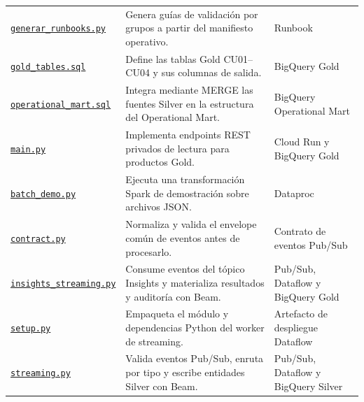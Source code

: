 \documentclass[11pt]{article}
\begin{document}
\begin{longtable}{@{}>{\raggedright\arraybackslash}p{}>{\raggedright\arraybackslash}p{}>{\raggedright\arraybackslash}p{}@{}}
\href{https://github.com/Codenid/lumina-retail-data-platform/blob/main/implementation/docs/operacion/runbooks/generar_runbooks.py}{\texttt{generar\_\allowbreak{}runbooks.py}} & Genera guías de validación por grupos a partir del manifiesto operativo. & Runbook \\
\href{https://github.com/Codenid/lumina-retail-data-platform/blob/main/implementation/automatizacion/configuracion/contratos/gold_tables.sql}{\texttt{gold\_\allowbreak{}tables.sql}} & Define las tablas Gold CU01–CU04 y sus columnas de salida. & BigQuery Gold \\
\href{https://github.com/Codenid/lumina-retail-data-platform/blob/main/implementation/automatizacion/configuracion/contratos/operational_mart.sql}{\texttt{operational\_\allowbreak{}mart.sql}} & Integra mediante MERGE las fuentes Silver en la estructura del Operational Mart. & BigQuery Operational Mart \\
\href{https://github.com/Codenid/lumina-retail-data-platform/blob/main/implementation/soluciones/api-insights/main.py}{\texttt{main.py}} & Implementa endpoints REST privados de lectura para productos Gold. & Cloud Run y BigQuery Gold \\
\href{https://github.com/Codenid/lumina-retail-data-platform/blob/main/implementation/soluciones/procesamiento-batch/batch_demo.py}{\texttt{batch\_\allowbreak{}demo.py}} & Ejecuta una transformación Spark de demostración sobre archivos JSON. & Dataproc \\
\href{https://github.com/Codenid/lumina-retail-data-platform/blob/main/implementation/soluciones/procesamiento-streaming/contract.py}{\texttt{contract.py}} & Normaliza y valida el envelope común de eventos antes de procesarlo. & Contrato de eventos Pub/Sub \\
\href{https://github.com/Codenid/lumina-retail-data-platform/blob/main/implementation/soluciones/procesamiento-streaming/insights_streaming.py}{\texttt{insights\_\allowbreak{}streaming.py}} & Consume eventos del tópico Insights y materializa resultados y auditoría con Beam. & Pub/Sub, Dataflow y BigQuery Gold \\
\href{https://github.com/Codenid/lumina-retail-data-platform/blob/main/implementation/soluciones/procesamiento-streaming/setup.py}{\texttt{setup.py}} & Empaqueta el módulo y dependencias Python del worker de streaming. & Artefacto de despliegue Dataflow \\
\href{https://github.com/Codenid/lumina-retail-data-platform/blob/main/implementation/soluciones/procesamiento-streaming/streaming.py}{\texttt{streaming.py}} & Valida eventos Pub/Sub, enruta por tipo y escribe entidades Silver con Beam. & Pub/Sub, Dataflow y BigQuery Silver \\

\end{longtable}
\end{document}

